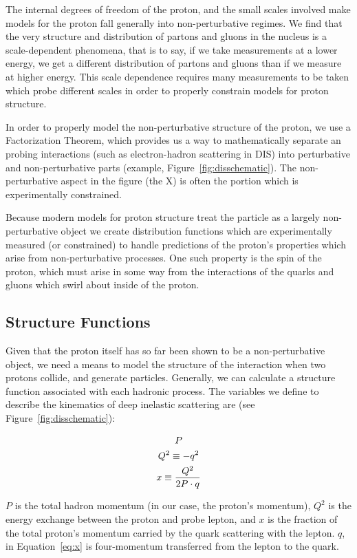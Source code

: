 The internal degrees of freedom of the proton, and the small scales involved
make models for the proton fall generally into non-perturbative regimes. We find
that the very structure and distribution of partons and gluons in the nucleus is
a scale-dependent phenomena, that is to say, if we take measurements at a lower
energy, we get a different distribution of partons and gluons than if we measure
at higher energy. This scale dependence requires many measurements to be taken
which probe different scales in order to properly constrain models for proton
structure. 

In order to properly model the non-perturbative structure of the proton, we use
a Factorization Theorem, which provides us a way to mathematically separate an
probing interactions (such as electron-hadron scattering in DIS) into
perturbative and non-perturbative parts (example,
Figure~\ref{fig:disschematic}). The non-perturbative aspect in the figure (the
X) is often the portion which is experimentally constrained.

Because modern models for proton structure treat the particle as a largely
non-perturbative object we create distribution functions which are
experimentally measured (or constrained) to handle predictions of the proton's
properties which arise from non-perturbative processes. One such property is the
spin of the proton, which must arise in some way from the interactions of the
quarks and gluons which swirl about inside of the proton.

\subsection{Structure Functions}
\label{sec:structure_functions}

Given that the proton itself has so far been shown to be a non-perturbative
object, we need a means to model the structure of the interaction when two
protons collide, and generate particles.  Generally, we can calculate a
structure function associated with each hadronic process. The variables we
define to describe the kinematics of deep inelastic scattering are (see
Figure~\ref{fig:disschematic}):

\begin{gather}
  P \label{eq:P}\\
  Q^2 \equiv -q^2 \label{eq:big_q_sq}\\
    x \equiv { Q^2 \over {2P\cdot q} } \label{eq:x}
\end{gather}

{\noindent}$P$ is the total hadron momentum (in our case, the proton's momentum),
$Q^2$ is the energy exchange between the proton and probe lepton, and $x$ is the
fraction of the total proton's momentum carried by the quark scattering with the
lepton.  $q$, in Equation~\ref{eq:x} is four-momentum transferred from the
lepton to the quark. \\


